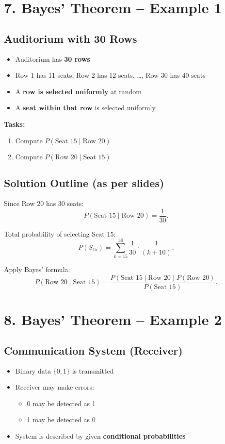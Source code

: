 \documentclass[12pt]{article}
\begin{document}
\section*{7. Bayes’ Theorem – Example 1}

\subsection*{Auditorium with 30 Rows}

\begin{itemize}
\item Auditorium has \textbf{30 rows}
\item Row 1 has 11 seats, Row 2 has 12 seats, …, Row 30 has 40 seats
\item A \textbf{row is selected uniformly} at random
\item A \textbf{seat within that row} is selected uniformly
\end{itemize}

\textbf{Tasks:}
\begin{enumerate}
\item Compute $P(\text{Seat 15} \mid \text{Row 20})$
\item Compute $P(\text{Row 20} \mid \text{Seat 15})$
\end{enumerate}

\subsection*{Solution Outline (as per slides)}

Since Row 20 has 30 seats:
\[
P(\text{Seat 15} \mid \text{Row 20}) = \frac{1}{30}.
\]

Total probability of selecting Seat 15:
\[
P(S_{15}) =
\sum_{k=15}^{30}
\frac{1}{30} \cdot \frac{1}{(k+10)}.
\]

Apply Bayes’ formula:
\[
P(\text{Row 20} \mid \text{Seat 15})
=
\frac{P(\text{Seat 15} \mid \text{Row 20}) P(\text{Row 20})}
     {P(\text{Seat 15})}.
\]

\section*{8. Bayes’ Theorem – Example 2}

\subsection*{Communication System (Receiver)}

\begin{itemize}
\item Binary data $\{0,1\}$ is transmitted
\item Receiver may make errors:
\begin{itemize}
\item 0 may be detected as 1
\item 1 may be detected as 0
\end{itemize}
\item System is described by given \textbf{conditional probabilities}
\end{itemize}
\end{document}
